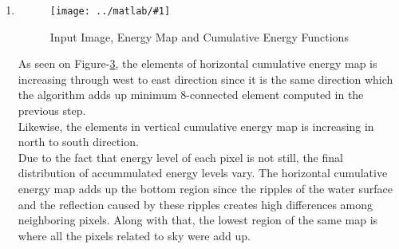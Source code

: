 \documentclass{article}
\newcommand{\listFigure}[3]{ \begin{figure}[H]
\texttt{[image: ../matlab/\#1]}
		\caption{#2\label{fig:#3}}
	\end{figure}		
}
\begin{document}
\begin{enumerate}
\begin{enumerate}
		\item Mall (Height Resizing) \\
		\begin{enumerate}
			\item Originial Image: Please see Figure-\ref{fig:inputSeamCarvingMall} \\
			\item Resized Image: \\
			\listFigure{outputReduceHeightMall.png}{Resized Image (Mall, Height, 775
			$\times$ 669)}{outputReduceHeightMall}
			\pagebreak
			\item Comparison: \\
			\listFigure{outputReduceHeightComparisonOutputsMall.png}{Comparison of Input Image and Output of Dynamic Programming
				Implementation}{outputReduceHeightComparisonOutputsMall}
			Legend for comparison image.
			\begin{itemize}
				\item Gray pixels: Common (shared) pixels on both images.
				\item Green pixels: The pixels that output image introduces.
				\item Magenta pixels: The pixels that output image lacks.
			\end{itemize}
		\end{enumerate}
		\pagebreak 
		\item Script: SeamCarvingReduceHeight.m
		
	\end{enumerate}

	\item 
	\listFigure{cumulatives.png}{Input Image, Energy Map and
	Cumulative Energy Functions}{cumulatives}	
	As seen on Figure-\ref{fig:cumulatives}, the elements of horizontal cumulative
	energy map is increasing through west to east direction since it is the same
	direction which the algorithm adds up minimum 8-connected element computed in the previous step. \\
	Likewise, the elements in vertical cumulative energy map is increasing in
	north to south direction. \\
	Due to the fact that energy level of each pixel is not still, the final
	distribution of accummulated energy levels vary. The horizontal cumulative
	energy map adds up the bottom region since the ripples of the water surface
	and the reflection caused by these ripples creates high differences among
	neighboring pixels. Along with that, the lowest region of the same map is
	where all the pixels related to sky were add up.
	\pagebreak


\end{enumerate}
\end{document}
